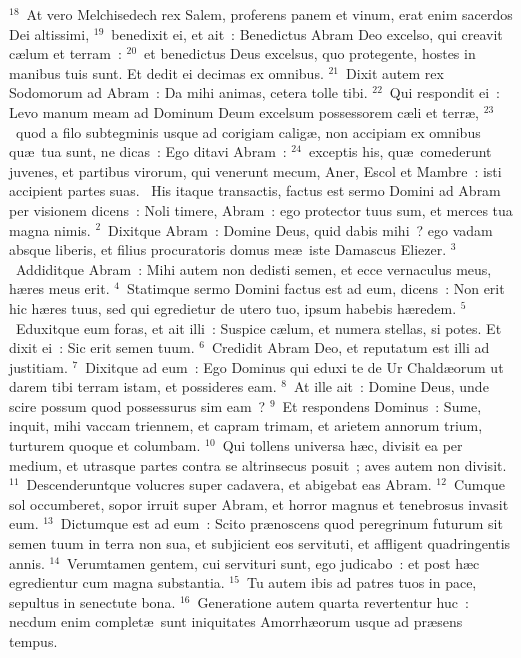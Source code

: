 ${}^{18}$~At vero Melchisedech rex Salem, proferens panem et vinum, erat enim sacerdos Dei altissimi,
${}^{19}$~benedixit ei, et ait~: Benedictus Abram Deo excelso, qui creavit c\ae lum et terram~:
${}^{20}$~et benedictus Deus excelsus, quo protegente, hostes in manibus tuis sunt. Et dedit ei decimas ex omnibus.
${}^{21}$~Dixit autem rex Sodomorum ad Abram~: Da mihi animas, cetera tolle tibi.
${}^{22}$~Qui respondit ei~: Levo manum meam ad Dominum Deum excelsum possessorem c\ae li et terr\ae ,
${}^{23}$~quod a filo subtegminis usque ad corigiam calig\ae , non accipiam ex omnibus qu\ae\ tua sunt, ne dicas~: Ego ditavi Abram~:
${}^{24}$~exceptis his, qu\ae\ comederunt juvenes, et partibus virorum, qui venerunt mecum, Aner, Escol et Mambre~: isti accipient partes suas.
~His itaque transactis, factus est sermo Domini ad Abram per visionem dicens~: Noli timere, Abram~: ego protector tuus sum, et merces tua magna nimis.
${}^{2}$~Dixitque Abram~: Domine Deus, quid dabis mihi~? ego vadam absque liberis, et filius procuratoris domus me\ae\ iste Damascus Eliezer.
${}^{3}$~Addiditque Abram~: Mihi autem non dedisti semen, et ecce vernaculus meus, h\ae res meus erit.
${}^{4}$~Statimque sermo Domini factus est ad eum, dicens~: Non erit hic h\ae res tuus, sed qui egredietur de utero tuo, ipsum habebis h\ae redem.
${}^{5}$~Eduxitque eum foras, et ait illi~: Suspice c\ae lum, et numera stellas, si potes. Et dixit ei~: Sic erit semen tuum.
${}^{6}$~Credidit Abram Deo, et reputatum est illi ad justitiam.
${}^{7}$~Dixitque ad eum~: Ego Dominus qui eduxi te de Ur Chald\ae orum ut darem tibi terram istam, et possideres eam.
${}^{8}$~At ille ait~: Domine Deus, unde scire possum quod possessurus sim eam~?
${}^{9}$~Et respondens Dominus~: Sume, inquit, mihi vaccam triennem, et capram trimam, et arietem annorum trium, turturem quoque et columbam.
${}^{10}$~Qui tollens universa h\ae c, divisit ea per medium, et utrasque partes contra se altrinsecus posuit~; aves autem non divisit.
${}^{11}$~Descenderuntque volucres super cadavera, et abigebat eas Abram.
${}^{12}$~Cumque sol occumberet, sopor irruit super Abram, et horror magnus et tenebrosus invasit eum.
${}^{13}$~Dictumque est ad eum~: Scito pr\ae noscens quod peregrinum futurum sit semen tuum in terra non sua, et subjicient eos servituti, et affligent quadringentis annis.
${}^{14}$~Verumtamen gentem, cui servituri sunt, ego judicabo~: et post h\ae c egredientur cum magna substantia.
${}^{15}$~Tu autem ibis ad patres tuos in pace, sepultus in senectute bona.
${}^{16}$~Generatione autem quarta revertentur huc~: necdum enim complet\ae\ sunt iniquitates Amorrh\ae orum usque ad pr\ae sens tempus.
